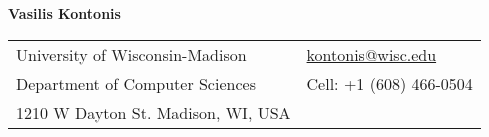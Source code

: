 \documentclass[letterpaper,11pt,oneside]{article}
\begin{document}

\noindent  \LARGE{\textbf{Vasilis Kontonis}}  \\
\vspace{-2ex}
\normalsize


\begin{center}
\begin{tabular}{l l}
 University of Wisconsin-Madison & \hspace{1in} \href{mailto:kontonis@wisc.edu}{kontonis@wisc.edu} \\
 Department of Computer Sciences & \hspace{1in}  Cell: +1 (608) 466-0504 \\
 1210 W Dayton St. Madison, WI, USA & \hspace{1in} \\
\end{tabular}
\end{center}

\vspace{1em}

\end{document}
